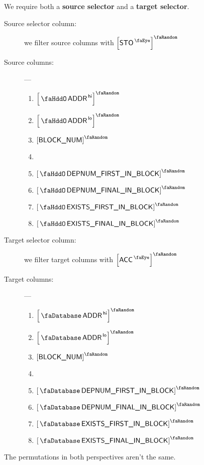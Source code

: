 \saNote{} We require both a \textbf{source selector} and a \textbf{target selector}.
\begin{description}
	\item[Source selector column:]
		we filter source columns with
		$\order{\peekStorage}$
	\item[Source columns:] ---
		\begin{multicols}{2}
			\begin{enumerate}
				\item $\order{\stoAddressHi}$
				\item $\order{\stoAddressLo}$
				\item $\order{\relBlockNum}$
				\item[\vspace{\fill}]
				\item $\order{\stoDeploymentNumberFirstInBlock}$
				\item $\order{\stoDeploymentNumberFinalInBlock}$
				\item $\order{\stoExistenceFirstInBlock}$
				\item $\order{\stoExistenceFinalInBlock}$
			\end{enumerate}
		\end{multicols}
	\item[Target selector column:]
		we filter target columns with
		$\order{\peekAccount}$
	\item[Target columns:] ---
		\begin{multicols}{2}
			\begin{enumerate}
				\item $\order{\accAddressHi}$
				\item $\order{\accAddressLo}$
				\item $\order{\relBlockNum}$
				\item[\vspace{\fill}]
				\item $\order{\accDeploymentNumberFirstInBlock}$
				\item $\order{\accDeploymentNumberFinalInBlock}$
				\item $\order{\accExistenceFirstInBlock}$
				\item $\order{\accExistenceFinalInBlock}$
			\end{enumerate}
		\end{multicols}
\end{description}
\saNote{} The permutations in both perspectives aren't the same.

